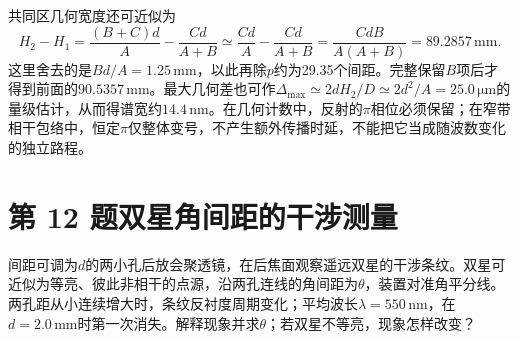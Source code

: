 \documentclass[UTF8,fontset=fandol,a4paper,11pt]{ctexart}
\begin{document}
共同区几何宽度还可近似为
\[
H_2-H_1=\frac{(B+C)d}{A}-\frac{Cd}{A+B}
\simeq\frac{Cd}{A}-\frac{Cd}{A+B}
=\frac{CdB}{A(A+B)}=89.2857\,\mathrm{mm}.
\]
这里舍去的是$Bd/A=1.25\,\mathrm{mm}$，以此再除$p$约为29.35个间距。完整保留$B$项后才得到前面的$90.5357\,\mathrm{mm}$。最大几何差也可作$\Delta_{\max}\simeq2dH_2/D\simeq2d^2/A=25.0\,\mathrm{\mu m}$的量级估计，从而得谱宽约$14.4\,\mathrm{nm}$。在几何计数中，反射的$\pi$相位必须保留；在窄带相干包络中，恒定$\pi$仅整体变号，不产生额外传播时延，不能把它当成随波数变化的独立路程。




\section*{第 12 题\quad 双星角间距的干涉测量}\label{q:12}

间距可调为$d$的两小孔后放会聚透镜，在后焦面观察遥远双星的干涉条纹。双星可近似为等亮、彼此非相干的点源，沿两孔连线的角间距为$\theta$，装置对准角平分线。两孔距从小连续增大时，条纹反衬度周期变化；平均波长$\lambda=550\,\mathrm{nm}$，在$d=2.0\,\mathrm{mm}$时第一次消失。解释现象并求$\theta$；若双星不等亮，现象怎样改变？
\end{document}
